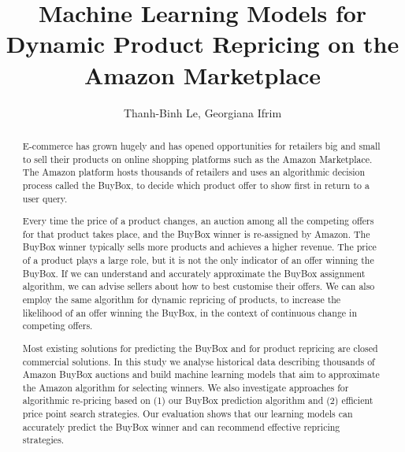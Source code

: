 \documentclass[sigchi]{acmart}
\begin{document}
\title{Machine Learning Models for Dynamic Product Repricing on the Amazon Marketplace}


\author{Thanh-Binh Le, Georgiana Ifrim}


\begin{abstract}	
	
	E-commerce has grown hugely and has opened opportunities for retailers big and small to sell their products on online shopping platforms such as the Amazon Marketplace. The Amazon platform hosts thousands of retailers and uses an algorithmic decision process called the BuyBox, to decide which product offer to show first in return to a user query.

	Every time the price of a product changes, an auction among all the competing offers for that product takes place, and the BuyBox winner is re-assigned by Amazon. The BuyBox winner typically sells more products and achieves a higher revenue. The price of a product plays a large role, but it is not the only indicator of an offer winning the BuyBox. If we can understand and accurately approximate the BuyBox assignment algorithm, we can advise sellers about how to best customise their offers. We can also employ the same algorithm for dynamic repricing of products, to increase the likelihood of an offer winning the BuyBox, in the context of continuous change in competing offers.
	
	Most existing solutions for predicting the BuyBox and for product repricing are closed commercial solutions. In this study we analyse historical data describing thousands of Amazon BuyBox auctions  and build machine learning models that aim to approximate the Amazon algorithm for selecting winners. We also investigate approaches for algorithmic re-pricing based on (1) our BuyBox prediction algorithm and (2) efficient price point search strategies. Our evaluation shows that our learning models can accurately predict the BuyBox winner and can recommend effective repricing strategies.
 
	
\end{abstract}

\maketitle





% 


%



 

\end{document}
